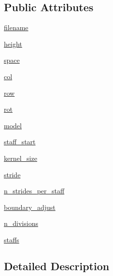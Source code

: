 \subsection*{Public Attributes}
\begin{DoxyCompactItemize}
\item 
\hyperlink{classautoscore_1_1datasets_1_1MusicFile_aacc6dc64cbc5fe1e92c6a06edc989afb}{filename}
\item 
\hyperlink{classautoscore_1_1datasets_1_1MusicFile_a9f6580afdca3397f15fe0e60b48a75cc}{height}
\item 
\hyperlink{classautoscore_1_1datasets_1_1MusicFile_af4e09b923bdd5383d414bb98352aa462}{space}
\item 
\hyperlink{classautoscore_1_1datasets_1_1MusicFile_a3fab23d7e20ab614e18c8d8b12e0fd57}{col}
\item 
\hyperlink{classautoscore_1_1datasets_1_1MusicFile_a861933bdc9897aff3416f6462dd1afdf}{row}
\item 
\hyperlink{classautoscore_1_1datasets_1_1MusicFile_a007db4b9326d26671bcd525eb6844a58}{rot}
\item 
\hyperlink{classautoscore_1_1datasets_1_1MusicFile_a5ff57ae711407456d3d211797d3c8eb1}{model}
\item 
\hyperlink{classautoscore_1_1datasets_1_1MusicFile_aa0496558ca272cd757c35daf4d790c02}{staff\+\_\+start}
\item 
\hyperlink{classautoscore_1_1datasets_1_1MusicFile_aa0c2d8221dbf487cbe40366174c4c4de}{kernel\+\_\+size}
\item 
\hyperlink{classautoscore_1_1datasets_1_1MusicFile_a2b86ffd7e820dba00ece053745db27cb}{stride}
\item 
\hyperlink{classautoscore_1_1datasets_1_1MusicFile_a4efb643f52223c36362b20b366f044b9}{n\+\_\+strides\+\_\+per\+\_\+staff}
\item 
\hyperlink{classautoscore_1_1datasets_1_1MusicFile_afe8a162e3c25071506d522dcd570a0be}{boundary\+\_\+adjust}
\item 
\hyperlink{classautoscore_1_1datasets_1_1MusicFile_a2554f38bd0d96e22e6328049b4f97d76}{n\+\_\+divisions}
\item 
\hyperlink{classautoscore_1_1datasets_1_1MusicFile_a7e6bd78a57ca8d50ffc47351c6126c41}{staffs}
\end{DoxyCompactItemize}


\subsection{Detailed Description}


